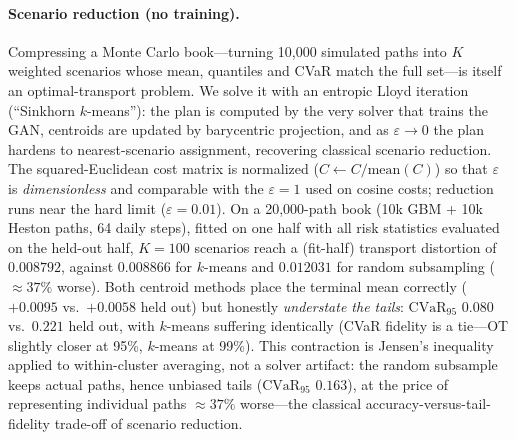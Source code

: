 \documentclass[10pt,twocolumn]{article}
\begin{document}
\paragraph{Scenario reduction (no training).} Compressing a Monte Carlo book---turning
10{,}000 simulated paths into $K$ weighted scenarios whose mean, quantiles and CVaR
match the full set---is itself an optimal-transport problem. We solve it with an
entropic Lloyd iteration (``Sinkhorn $k$-means''): the plan is computed by the very
solver that trains the GAN, centroids are updated by barycentric projection, and as
$\varepsilon \to 0$ the plan hardens to nearest-scenario assignment, recovering
classical scenario reduction. The squared-Euclidean cost matrix is normalized
($C \leftarrow C/\mathrm{mean}(C)$) so that $\varepsilon$ is \emph{dimensionless} and
comparable with the $\varepsilon=1$ used on cosine costs; reduction runs near the
hard limit ($\varepsilon=0.01$). On a 20{,}000-path book (10k GBM + 10k Heston paths,
64 daily steps), fitted on one half with all risk statistics evaluated on the held-out half, $K=100$
scenarios reach a (fit-half) transport distortion of $0.008792$, against $0.008866$ for $k$-means and
$0.012031$ for random subsampling ($\approx 37\%$ worse). Both centroid methods place
the terminal mean correctly ($+0.0095$ vs.\ $+0.0058$ held out) but honestly
\emph{understate the tails}: $\mathrm{CVaR}_{95}$ $0.080$ vs.\ $0.221$ held out, with
$k$-means suffering identically (CVaR fidelity is a tie---OT slightly closer at
95\%, $k$-means at 99\%). This contraction is Jensen's inequality applied to
within-cluster averaging, not a solver artifact: the random subsample keeps actual
paths, hence unbiased tails ($\mathrm{CVaR}_{95}$ $0.163$), at the price of
representing individual paths $\approx 37\%$ worse---the classical
accuracy-versus-tail-fidelity trade-off of scenario reduction.
\end{document}
